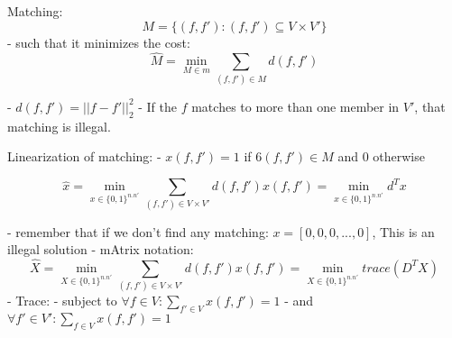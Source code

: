 Matching: 
\[M = \{(f,f'):(f,f')\subseteq V \times V'\}\]
- such that it minimizes the cost:
\[\hat{M} = \min_{M \in m} \sum_{(f,f')\in M} d(f,f')\]

- $d(f,f') = ||f-f'||^2_2$
- If the $f$ matches to more than one member in $V'$, that matching is illegal.

Linearization of matching:
- $x(f,f') = 1$ if $6(f,f') \in M$ and $0$ otherwise

\[ \hat{x} = \min_{x\in\{0,1\}^{n.n'}}\sum_{(f,f')\in V\times V'} d(f,f')x(f,f') = \min_{x\in\{0,1\}^{n.n'}}d^Tx\]

- remember that if we don't find any matching: $x = [0,0,0,...,0]$, This is an illegal solution
- mAtrix notation:
\[ \hat{X} = \min_{X\in\{0,1\}^{n.n'}}\sum_{(f,f')\in V\times V'} d(f,f')x(f,f') = \min_{X\in\{0,1\}^{n.n'}} trace(D^TX)\]
- Trace: 
- subject to $\forall f \in V: \sum_{f'\in V} x(f,f') = 1$
- and       $\forall f' \in V': \sum_{f\in V} x(f,f') = 1$

